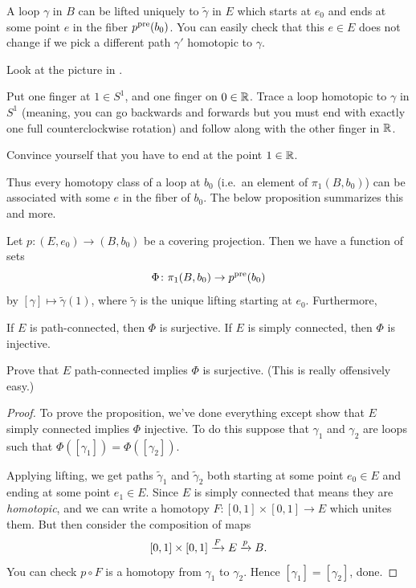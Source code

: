 A loop $\gamma$ in $B$ can be lifted uniquely to $\tilde\gamma$ in $E$
which starts at $e_0$ and ends at some point $e$ in the fiber $p^{\text{pre}}(b_0)$.
You can easily check that this $e \in E$ does not change if we
pick a different path $\gamma'$ homotopic to $\gamma$.
\begin{ques}
	Look at the picture in .

	Put one finger at $1 \in S^1$, and one finger on $0 \in \mathbb R$.
	Trace a loop homotopic to $\gamma$ in $S^1$ (meaning, you can
	go backwards and forwards but you must end with exactly one full
	counterclockwise rotation)
	and follow along with the other finger in $\mathbb R$.

	Convince yourself that you have to end at the point $1 \in \mathbb R$.
\end{ques}

Thus every homotopy class of a loop at $b_0$ (i.e.\ an element of $\pi_1(B, b_0)$) can be associated with some $e$ in the fiber of $b_0$.
The below proposition summarizes this and more.
\begin{proposition}
	Let $p \colon (E,e_0) \to (B,b_0)$ be a covering projection.
	Then we have a function of sets
	\[ \Phi \colon \pi_1(B, b_0) \to p^{\text{pre}}(b_0) \]
	by $[\gamma] \mapsto \tilde\gamma(1)$, where $\tilde\gamma$
	is the unique lifting starting at $e_0$.
	Furthermore,
	\begin{itemize}
		\ii If $E$ is path-connected, then $\Phi$ is surjective.
		\ii If $E$ is simply connected, then $\Phi$ is injective.
	\end{itemize}
\end{proposition}
\begin{ques}
	Prove that $E$ path-connected implies $\Phi$ is surjective.
	(This is really offensively easy.)
\end{ques}
\begin{proof}
	To prove the proposition, we've done everything except show
	that $E$ simply connected implies $\Phi$ injective.
	To do this suppose that $\gamma_1$ and $\gamma_2$ are loops
	such that $\Phi([\gamma_1]) = \Phi([\gamma_2])$.

	Applying lifting, we get paths $\tilde\gamma_1$ and $\tilde\gamma_2$
	both starting at some point $e_0 \in E$ and ending at some point $e_1 \in E$.
	Since $E$ is simply connected that means they are \emph{homotopic},
	and we can write a homotopy $F \colon [0,1] \times [0,1] \to E$
	which unites them.
	But then consider the composition of maps
	\[ [0,1] \times [0,1] \xrightarrow{F} E \xrightarrow{p} B. \]
	You can check $p \circ F$ is a homotopy from $\gamma_1$ to $\gamma_2$.
	Hence $[\gamma_1] = [\gamma_2]$, done.
\end{proof}

